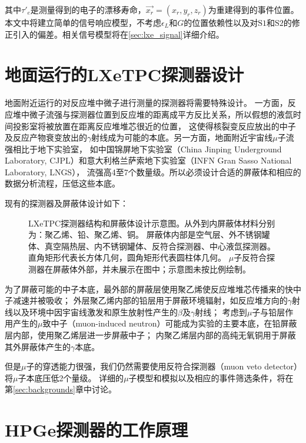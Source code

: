 其中$\tau'_e$是测量得到的电子的漂移寿命，$\vec{x_r}=(x_r,y_r,z_r)$为重建得到的事件位置。
本文中将建立简单的信号响应模型，不考虑$\epsilon_L$和$G$的位置依赖性以及对$\mathrm{S1}$和$\mathrm{S2}$的修正引入的偏差。相关信号模型将在\ref{sec:lxe_signal}详细介绍。

\section{地面运行的LXeTPC探测器设计}

地面附近运行的对反应堆中微子进行测量的探测器将需要特殊设计。
一方面，反应堆中微子流强与探测器位置到反应堆的距离成平方反比关系，所以假想的液氙时间投影室将被放置在距离反应堆堆芯很近的位置，
这使得核裂变反应放出的中子及反应产物衰变放出的$\gamma$射线成为可能的本底。另一方面，地面附近宇宙线$\mu$子流强相比于地下实验室，
如中国锦屏地下实验室（China Jinping Underground Laboratory, CJPL）和意大利格兰萨索地下实验室（INFN Gran Sasso National Laboratory, LNGS），
流强高4至7个数量级\cite{guo_muon_2021}。所以必须设计合适的屏蔽体和相应的数据分析流程，压低这些本底。

现有的探测器及屏蔽体设计如下：

\begin{figure}
    \centering
    
    \caption{\label{fig:relics_geo} LXeTPC探测器结构和屏蔽体设计示意图。从外到内屏蔽体材料分别为：聚乙烯、铅、聚乙烯、铜。
    屏蔽体内部是空气层、外不锈钢罐体、真空隔热层、内不锈钢罐体、反符合探测器、中心液氙探测器。
    直角矩形代表长方体几何，圆角矩形代表圆柱体几何。
    $\mu$子反符合探测器在屏蔽体外部，并未展示在图中；示意图未按比例绘制。}
\end{figure}

为了屏蔽可能的中子本底，最外部的屏蔽层使用聚乙烯使反应堆堆芯传播来的快中子减速并被吸收；
外层聚乙烯内部的铅层用于屏蔽环境辐射，如反应堆方向的$\gamma$射线以及环境中因宇宙线激发和原生放射性产生的$\beta$及$\gamma$射线；
考虑到$\mu$子与铅层作用产生的$\mu$致中子（muon-induced neutron）可能成为实验的主要本底，在铅屏蔽层内部，使用聚乙烯层进一步屏蔽中子；
内聚乙烯层内部的高纯无氧铜用于屏蔽其外屏蔽体产生的$\gamma$本底。

但是$\mu$子的穿透能力很强，我们仍然需要使用反符合探测器（muon veto detector）将$\mu$子本底压低2个量级。
详细的$\mu$子模型和模拟以及相应的事件筛选条件，将在第\ref{sec:backgrounds}章中讨论。

\section{HPGe探测器的工作原理}
